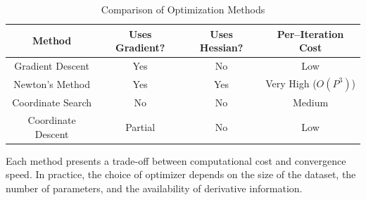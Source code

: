 \documentclass{article}
\begin{document}
\begin{table}[H]
\centering
\begin{tabular}{c|c|c|c}
\textbf{Method} & \textbf{Uses Gradient?} & \textbf{Uses Hessian?} & \textbf{Per–Iteration Cost} \\
\hline
Gradient Descent & Yes & No & Low \\
Newton’s Method & Yes & Yes & Very High ($O(P^3)$) \\
Coordinate Search & No & No & Medium \\
Coordinate Descent & Partial & No & Low \\
\end{tabular}
\caption{Comparison of Optimization Methods}
\end{table}

Each method presents a trade-off between computational cost and convergence speed. In practice, the choice of optimizer depends on the size of the dataset, the number of parameters, and the availability of derivative information.








\end{document}
